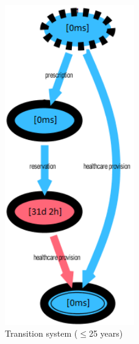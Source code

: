 \begin{figure} [htbp]
\begin{minipage}[t]{0.5\textwidth}
\includegraphics[width=0.5\textwidth]{AmbulatorioSojournYoungs}
\caption{Transition system ($\leq$25 years)}
\end{minipage}
\begin{minipage}[t]{0.5\textwidth}

\end{minipage}
\end{figure}
